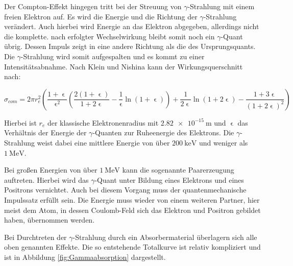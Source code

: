 Der Compton-Effekt hingegen tritt bei der Streuung von $\gamma$-Strahlung mit einem freien Elektron auf.
Es wird die Energie und die Richtung der $\gamma$-Strahlung verändert.
Auch hierbei wird Energie an das Elektron abgegeben, allerdings nicht die komplette.
nach erfolgter Wechselwirkung bleibt somit noch ein $\gamma$-Quant übrig.
Dessen Impuls zeigt in eine andere Richtung als die des Ursprungsquants.
Die $\gamma$-Strahlung wird somit aufgespalten und es kommt zu einer Intensitätsabnahme.
Nach Klein und Nishina kann der Wirkungsquerschnitt nach:

\begin{equation}
  \sigma_{com} = 2 \pi r^2_e \left(\frac{1+\upvarepsilon}{\upvarepsilon^2} \left(\frac{2(1+\upvarepsilon)}{1+2\upvarepsilon} - \frac{1}{\upvarepsilon} \ln(1+\upvarepsilon)\right) + \frac{1}{2\upvarepsilon} \ln(1 + 2\upvarepsilon) - \frac{1+3\upvarepsilon}{(1+2\upvarepsilon)^2}\right)
  \label{eqn:sigmacom}
\end{equation}

Hierbei ist $r_e$ der klassische Elektronenradius mit $\SI{2.82e-15}{\metre}$ und $\upvarepsilon$ das Verhältnis der Energie der $\gamma$-Quanten zur Ruheenergie des Elektrons.
Die $\gamma$-Strahlung weist dabei eine mittlere Energie von über $\SI{200}{\kilo\electronvolt}$ und weniger als $\SI{1}{\mega\electronvolt}$.


Bei großen Energien von über $\SI{1}{\mega\electronvolt}$ kann die sogenannte Paarerzeugung auftreten.
Hierbei wird das $\gamma$-Quant unter Bildung eines Elektrons und eines Positrons vernichtet.
Auch bei diesem Vorgang muss der quantenmechanische Impulssatz erfüllt sein.
Die Energie muss wieder von einem weiteren Partner, hier meist dem Atom, in dessen Coulomb-Feld sich das Elektron und Positron gebildet haben, übernommen werden.


Bei Durchtreten der $\gamma$-Strahlung durch ein Absorbermaterial überlagern sich alle oben genannten Effekte.
Die so entstehende Totalkurve ist relativ kompliziert und ist in Abbildung \ref{fig:Gammaabsorption} dargestellt.
